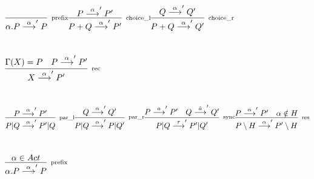 \documentclass[10pt, landscape]{scrartcl}
\begin{document}
\section*{\CCSZero}
\begin{math}
\prefix{\alpha}{P} \\
\choicel{\edge{P}{\alpha}{P'} }{P}{Q}{\alpha}{P'} \\
\choicer{\edge{Q}{\alpha}{Q'} }{P}{Q}{\alpha}{Q'} \\
\end{math}

\section*{\CCSZeroW}
\begin{math}
 \rec{X}{P}{\edge{P}{\alpha}{P'}}{\alpha}{P'} \\
\end{math}

\section*{\CCS}
\begin{math}
\parl{\edge{P}{\alpha}{P'} }{P}{Q}{\alpha}{P'} \\
\parr{\edge{Q}{\alpha}{Q'} }{P}{Q}{\alpha}{Q'} \\
\sync{\edge{P}{a}{P'} }{\edge{Q}{\bar{a}}{Q'} }{P}{Q}{P'}{Q'} \\
\res{\edge{P}{\alpha}{P'} }{\alpha}{H}{P}{P'}
\end{math}

\section*{\CCSvp}
\begin{math}
 \prefixvp{\alpha}{P}
\end{math}
\end{document}
